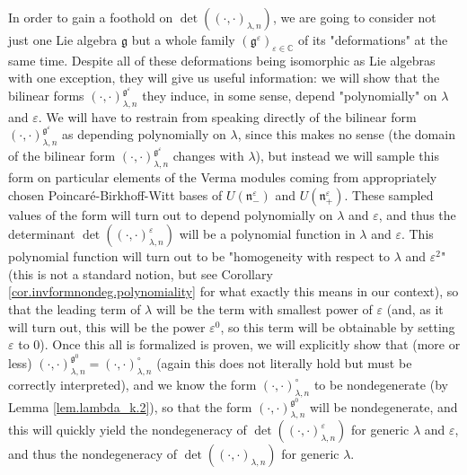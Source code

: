 \documentclass
[numbers=enddot,12pt,final,onecolumn,german,notitlepage]{scrartcl}%
\theoremstyle{definition}
\begin{document}
In order to gain a foothold on $\det\left(  \left(  \cdot,\cdot\right)
_{\lambda,n}\right)  $, we are going to consider not just one Lie algebra
$\mathfrak{g}$ but a whole family $\left(  \mathfrak{g}^{\varepsilon}\right)
_{\varepsilon\in\mathbb{C}}$ of its "deformations" at the same time. Despite
all of these deformations being isomorphic as Lie algebras with one exception,
they will give us useful information: we will show that the bilinear forms
$\left(  \cdot,\cdot\right)  _{\lambda,n}^{\mathfrak{g}^{\varepsilon}}$ they
induce, in some sense, depend "polynomially" on $\lambda$ and $\varepsilon$.
We will have to restrain from speaking directly of the bilinear form $\left(
\cdot,\cdot\right)  _{\lambda,n}^{\mathfrak{g}^{\varepsilon}}$ as depending
polynomially on $\lambda$, since this makes no sense (the domain of the
bilinear form $\left(  \cdot,\cdot\right)  _{\lambda,n}^{\mathfrak{g}%
^{\varepsilon}}$ changes with $\lambda$), but instead we will sample this form
on particular elements of the Verma modules coming from appropriately chosen
Poincar\'{e}-Birkhoff-Witt bases of $U\left(  \mathfrak{n}_{-}^{\varepsilon
}\right)  $ and $U\left(  \mathfrak{n}_{+}^{\varepsilon}\right)  $. These
sampled values of the form will turn out to depend polynomially on $\lambda$
and $\varepsilon$, and thus the determinant $\det\left(  \left(  \cdot
,\cdot\right)  _{\lambda,n}^{\varepsilon}\right)  $ will be a polynomial
function in $\lambda$ and $\varepsilon$. This polynomial function will turn
out to be "homogeneity with respect to $\lambda$ and $\varepsilon^{2}$" (this
is not a standard notion, but see Corollary
\ref{cor.invformnondeg.polynomiality} for what exactly this means in our
context), so that the leading term of $\lambda$ will be the term with smallest
power of $\varepsilon$ (and, as it will turn out, this will be the power
$\varepsilon^{0}$, so this term will be obtainable by setting $\varepsilon$ to
$0$). Once this all is formalized is proven, we will explicitly show that
(more or less) $\left(  \cdot,\cdot\right)  _{\lambda,n}^{\mathfrak{g}^{0}%
}=\left(  \cdot,\cdot\right)  _{\lambda,n}^{\circ}$ (again this does not
literally hold but must be correctly interpreted), and we know the form
$\left(  \cdot,\cdot\right)  _{\lambda,n}^{\circ}$ to be nondegenerate (by
Lemma \ref{lem.lambda_k.2}), so that the form $\left(  \cdot,\cdot\right)
_{\lambda,n}^{\mathfrak{g}^{0}}$ will be nondegenerate, and this will quickly
yield the nondegeneracy of $\det\left(  \left(  \cdot,\cdot\right)
_{\lambda,n}^{\varepsilon}\right)  $ for generic $\lambda$ and $\varepsilon$,
and thus the nondegeneracy of $\det\left(  \left(  \cdot,\cdot\right)
_{\lambda,n}\right)  $ for generic $\lambda$.
\end{document}
